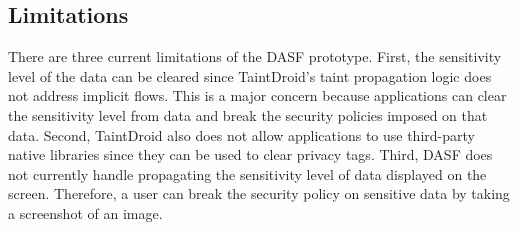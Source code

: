 \subsection{Limitations}

There are three current limitations of the DASF prototype.  First,
the sensitivity level of the data can be cleared since TaintDroid's
taint propagation logic does not address implicit flows. This is a major
concern because applications can clear the sensitivity
level from data and break the security policies imposed on that data.
Second, TaintDroid also does not allow applications to use third-party
native libraries since they can be used to clear privacy tags.  Third,
DASF does not currently handle propagating
the sensitivity level of data displayed on the screen.  Therefore,
a user can break the security policy on sensitive data by taking a
screenshot of an image.

